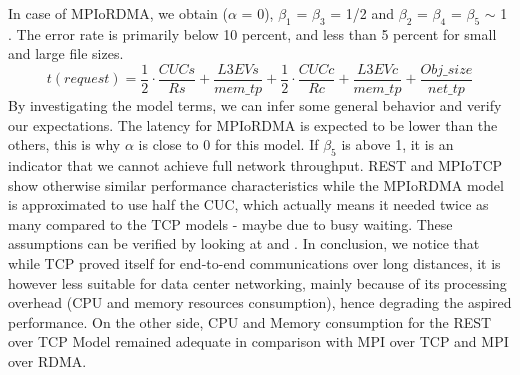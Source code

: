 \documentclass[runningheads]{llncs}
\begin{document}
In case of MPIoRDMA, we obtain ($\alpha$ = 0), $\beta_1$ = $\beta_3$ = 1/2 and  $\beta_2$ = $\beta_4$ = $\beta_5$ $\sim$ 1 . The error rate is primarily below 10 percent, and less than 5 percent for small and large file sizes.
\begin{equation}
\label{eq:model-rest}
t(request)=\frac{1}{2}\cdot\frac{CUCs}{Rs}+\frac{L3EVs}{mem\_tp}+\frac{1}{2}\cdot\frac{CUCc}{Rc}+\frac{L3EVc}{mem\_tp}+\frac{Obj\_size}{net\_tp}
\end{equation}
By investigating the model terms, we can infer some general behavior and verify our expectations. The latency for MPIoRDMA is expected to be lower than the others, this  is why $\alpha$ is close to 0 for this model. If $\beta_5$ is above 1, it is an indicator that we cannot achieve full network throughput. REST and MPIoTCP show otherwise similar performance characteristics while the MPIoRDMA model is approximated to use half the CUC, which actually means it needed twice as many compared to the TCP models - maybe due to busy waiting. These assumptions can be verified by looking at  and .
In conclusion, we notice that while TCP proved itself for end-to-end communications over long distances, it is however less suitable for data center networking, mainly because of its processing overhead (CPU and memory resources consumption), hence degrading the aspired performance. On the other side, CPU and Memory consumption for the REST over TCP Model remained adequate in comparison with MPI over TCP and MPI over RDMA.
\end{document}
